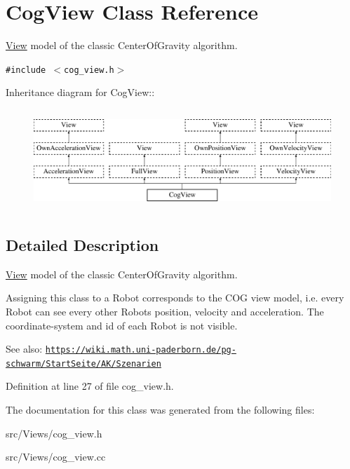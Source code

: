 \hypertarget{class_cog_view}{
\section{CogView Class Reference}
\label{class_cog_view}
}
\hyperlink{class_view}{View} model of the classic CenterOfGravity algorithm.  


{\tt \#include $<$cog\_\-view.h$>$}

Inheritance diagram for CogView::\begin{figure}[H]
\begin{center}
\leavevmode
\includegraphics[height=3.83562cm]{class_cog_view}
\end{center}
\end{figure}


\subsection{Detailed Description}
\hyperlink{class_view}{View} model of the classic CenterOfGravity algorithm. 

Assigning this class to a Robot corresponds to the COG view model, i.e. every Robot can see every other Robots position, velocity and acceleration. The coordinate-system and id of each Robot is not visible.

\begin{Desc}
\item[See also:]\href{https://wiki.math.uni-paderborn.de/pg-schwarm/StartSeite/AK/Szenarien}{\tt https://wiki.math.uni-paderborn.de/pg-schwarm/StartSeite/AK/Szenarien} \end{Desc}


Definition at line 27 of file cog\_\-view.h.

The documentation for this class was generated from the following files:\begin{CompactItemize}
\item 
src/Views/cog\_\-view.h\item 
src/Views/cog\_\-view.cc\end{CompactItemize}
